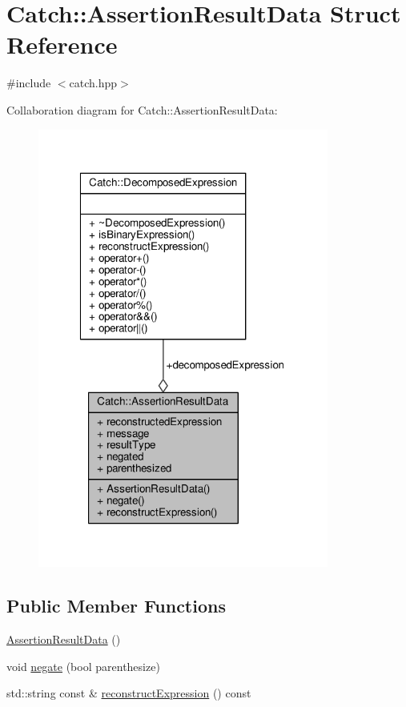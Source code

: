 \hypertarget{struct_catch_1_1_assertion_result_data}{\section{Catch\-:\-:Assertion\-Result\-Data Struct Reference}
\label{struct_catch_1_1_assertion_result_data}
}


{\ttfamily \#include $<$catch.\-hpp$>$}



Collaboration diagram for Catch\-:\-:Assertion\-Result\-Data\-:
\nopagebreak
\begin{figure}[H]
\begin{center}
\leavevmode
\includegraphics[width=271pt]{struct_catch_1_1_assertion_result_data__coll__graph}
\end{center}
\end{figure}
\subsection*{Public Member Functions}
\begin{DoxyCompactItemize}
\item 
\hyperlink{struct_catch_1_1_assertion_result_data_a37179edde9f853f22d4456677fd97701}{Assertion\-Result\-Data} ()
\item 
void \hyperlink{struct_catch_1_1_assertion_result_data_a3b4df7cd1f8228ea1144b5cd0af6006a}{negate} (bool parenthesize)
\item 
std\-::string const \& \hyperlink{struct_catch_1_1_assertion_result_data_ac45208e1a464864f4112ac72c6938b4f}{reconstruct\-Expression} () const 
\end{DoxyCompactItemize}
